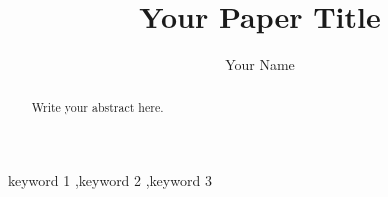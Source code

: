 \documentclass[preprint,12pt]{elsarticle}
\begin{document}
\begin{frontmatter}
\title{Your Paper Title}
\author{Your Name}
\begin{abstract}
Write your abstract here.
\end{abstract}
\begin{keyword}
keyword 1 \sep keyword 2 \sep keyword 3
\end{keyword}
\end{frontmatter}







\end{document}
